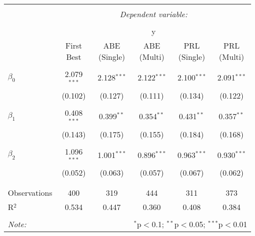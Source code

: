 
\begin{tabular}{@{\extracolsep{5pt}}lccccc} 
\\[-1.8ex]\hline 
\hline \\[-1.8ex] 
 & \multicolumn{5}{c}{\textit{Dependent variable:}} \\ 
\cline{2-6} 
\\[-1.8ex] & \multicolumn{5}{c}{y} \\ 
 & First Best & ABE (Single) & ABE (Multi) & PRL (Single) & PRL (Multi) \\ 
\hline \\[-1.8ex] 
 $\beta_0$ & 2.079$^{***}$ & 2.128$^{***}$ & 2.122$^{***}$ & 2.100$^{***}$ & 2.091$^{***}$ \\ 
  & (0.102) & (0.127) & (0.111) & (0.134) & (0.122) \\ 
  & & & & & \\ 
 $\beta_1$ & 0.408$^{***}$ & 0.399$^{**}$ & 0.354$^{**}$ & 0.431$^{**}$ & 0.357$^{**}$ \\ 
  & (0.143) & (0.175) & (0.155) & (0.184) & (0.168) \\ 
  & & & & & \\ 
 $\beta_2$ & 1.096$^{***}$ & 1.001$^{***}$ & 0.896$^{***}$ & 0.963$^{***}$ & 0.930$^{***}$ \\ 
  & (0.052) & (0.063) & (0.057) & (0.067) & (0.062) \\ 
  & & & & & \\ 
\hline \\[-1.8ex] 
Observations & 400 & 319 & 444 & 311 & 373 \\ 
R$^{2}$ & 0.534 & 0.447 & 0.360 & 0.408 & 0.384 \\ 
\hline 
\hline \\[-1.8ex] 
\textit{Note:}  & \multicolumn{5}{r}{$^{*}$p$<$0.1; $^{**}$p$<$0.05; $^{***}$p$<$0.01} \\ 
\end{tabular} 
